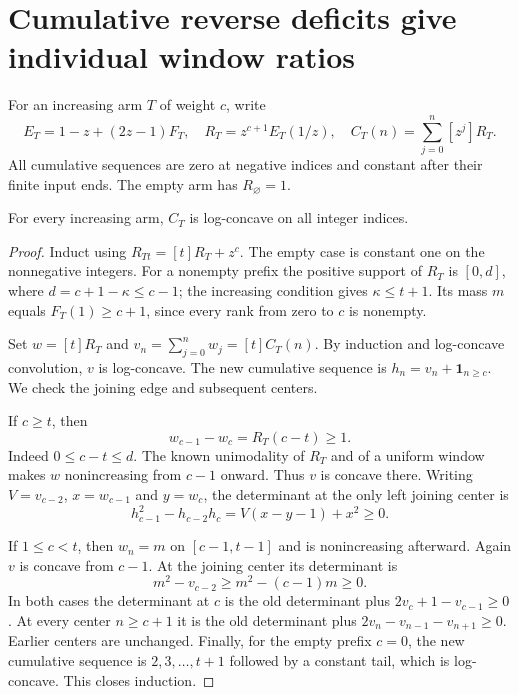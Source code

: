 \section{Cumulative reverse deficits give individual window ratios}
For an increasing arm $T$ of weight $c$, write
\[
 E_T=1-z+(2z-1)F_T,\quad R_T=z^{c+1}E_T(1/z),\quad
 C_T(n)=\sum_{j=0}^n[z^j]R_T.
\]
All cumulative sequences are zero at negative indices and constant
after their finite input ends. The empty arm has $R_\varnothing=1$.

\begin{theorem}\label{thm:deficit-cumulative-lc}
For every increasing arm, $C_T$ is log-concave on all integer indices.
\end{theorem}
\begin{proof}
Induct using $R_{Tt}=[t]R_T+z^c$. The empty case is constant one
on the nonnegative integers. For a nonempty prefix the positive
support of $R_T$ is $[0,d]$, where $d=c+1-\kappa\le c-1$;
the increasing condition gives $\kappa\le t+1$. Its mass $m$ equals
$F_T(1)\ge c+1$, since every rank from zero to $c$ is nonempty.

Set $w=[t]R_T$ and $v_n=\sum_{j=0}^n w_j=[t]C_T(n)$.
By induction and log-concave convolution, $v$ is log-concave.
The new cumulative sequence is $h_n=v_n+\mathbf1_{n\ge c}$.
We check the joining edge and subsequent centers.

If $c\ge t$, then
\[
 w_{c-1}-w_c=R_T(c-t)\ge1.
\]
Indeed $0\le c-t\le d$. The known unimodality of $R_T$
and of a uniform window makes $w$ nonincreasing from $c-1$
onward. Thus $v$ is concave there. Writing
$V=v_{c-2}$, $x=w_{c-1}$ and $y=w_c$, the determinant at
the only left joining center is
\[
 h_{c-1}^2-h_{c-2}h_c=V(x-y-1)+x^2\ge0.
\]

If $1\le c<t$, then $w_n=m$ on $[c-1,t-1]$ and is
nonincreasing afterward. Again $v$ is concave from $c-1$.
At the joining center its determinant is
\[
 m^2-v_{c-2}\ge m^2-(c-1)m\ge0.
\]
In both cases the determinant at $c$ is the old determinant
plus $2v_c+1-v_{c-1}\ge0$. At every center $n\ge c+1$ it is
the old determinant plus $2v_n-v_{n-1}-v_{n+1}\ge0$.
Earlier centers are unchanged. Finally, for the empty prefix
$c=0$, the new cumulative sequence is $2,3,\ldots,t+1$ followed
by a constant tail, which is log-concave. This closes induction.
\end{proof}

